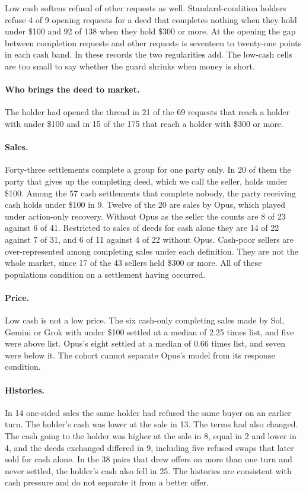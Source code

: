 \documentclass[11pt,letterpaper]{article}
\begin{document}
Low cash softens refusal of other requests as well. Standard-condition holders refuse 4 of 9 opening requests for a deed that completes nothing when they hold under \$100 and 92 of 138 when they hold \$300 or more. At the opening the gap between completion requests and other requests is seventeen to twenty-one points in each cash band. In these records the two regularities add. The low-cash cells are too small to say whether the guard shrinks when money is short.

\paragraph{Who brings the deed to market.} The holder had opened the thread in 21 of the 69 requests that reach a holder with under \$100 and in 15 of the 175 that reach a holder with \$300 or more.

\paragraph{Sales.} Forty-three settlements complete a group for one party only. In 20 of them the party that gives up the completing deed, which we call the seller, holds under \$100. Among the 57 cash settlements that complete nobody, the party receiving cash holds under \$100 in 9. Twelve of the 20 are sales by Opus, which played under action-only recovery. Without Opus as the seller the counts are 8 of 23 against 6 of 41. Restricted to sales of deeds for cash alone they are 14 of 22 against 7 of 31, and 6 of 11 against 4 of 22 without Opus. Cash-poor sellers are over-represented among completing sales under each definition. They are not the whole market, since 17 of the 43 sellers held \$300 or more. All of these populations condition on a settlement having occurred.

\paragraph{Price.} Low cash is not a low price. The six cash-only completing sales made by Sol, Gemini or Grok with under \$100 settled at a median of 2.25 times list, and five were above list. Opus's eight settled at a median of 0.66 times list, and seven were below it. The cohort cannot separate Opus's model from its response condition.

\paragraph{Histories.} In 14 one-sided sales the same holder had refused the same buyer on an earlier turn. The holder's cash was lower at the sale in 13. The terms had also changed. The cash going to the holder was higher at the sale in 8, equal in 2 and lower in 4, and the deeds exchanged differed in 9, including five refused swaps that later sold for cash alone. In the 38 pairs that drew offers on more than one turn and never settled, the holder's cash also fell in 25. The histories are consistent with cash pressure and do not separate it from a better offer.
\end{document}
